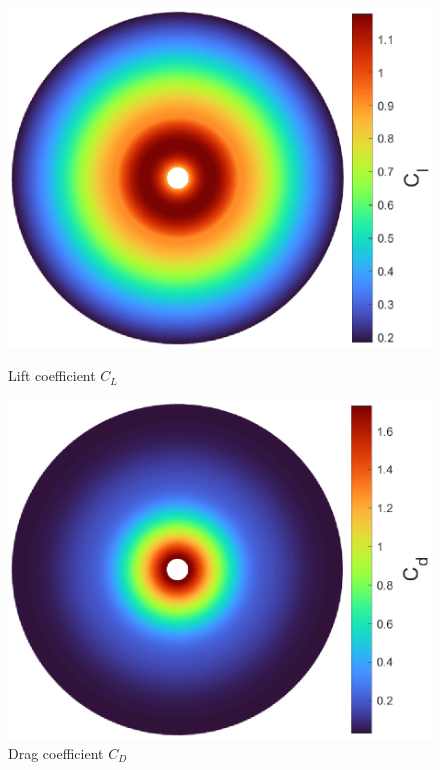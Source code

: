 {\begin{figure}[!htb]
    \centering
    \begin{minipage}{.49\textwidth}
      \centering
      \includegraphics[width=\textwidth]{Figures/comp_method/sim_B/cl.eps}
      \caption{Lift coefficient $C_L$}
      \label{fig:lift_coefficient_paper}
    \end{minipage}%
    \hfill
    \begin{minipage}{.49\textwidth}
      \centering
      \includegraphics[width=\textwidth]{Figures/comp_method/sim_B/cd.eps}
      \caption{Drag coefficient $C_D$}
      \label{fig:drag_coefficient_paper}
    \end{minipage}
\end{figure}

}
